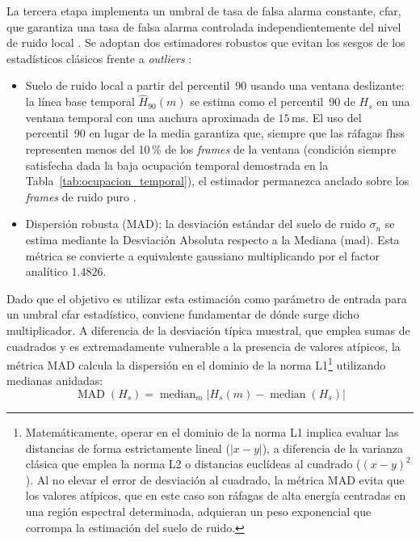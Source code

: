 La tercera etapa implementa un umbral de tasa de falsa alarma constante, \gls{cfar}, que garantiza una tasa de falsa alarma controlada independientemente del nivel de ruido local \cite{zhang_entropy-based_1989}. Se adoptan dos estimadores robustos que evitan los sesgos de los estadísticos clásicos frente a \textit{outliers} \cite{hampel_robust_1986}:

\begin{itemize}\itemsep 0em
    \item Suelo de ruido local a partir del percentil~90 usando una ventana deslizante: la línea base temporal $\widehat{H}_{90}(m)$ se estima como el percentil~90 de $H_s$ en una ventana temporal con una anchura aproximada de $15$\,ms. El uso del percentil~90 en lugar de la media garantiza que, siempre que las ráfagas \gls{fhss} representen menos del 10\,\% de los \textit{frames} de la ventana (condición siempre satisfecha dada la baja ocupación temporal demostrada en la Tabla~\ref{tab:ocupacion_temporal}), el estimador permanezca anclado sobre los \textit{frames} de ruido puro \cite{vasant_ahirrao_rf-based_2024}.

     \item Dispersión robusta (MAD): la desviación estándar del suelo de ruido $\sigma_n$ se estima mediante la Desviación Absoluta respecto a la Mediana (\gls{mad}). Esta métrica se convierte a equivalente gaussiano multiplicando por el factor analítico $1.4826$.
\end{itemize}

Dado que el objetivo es utilizar esta estimación como parámetro de entrada para un umbral \gls{cfar} estadístico, conviene fundamentar de dónde surge dicho multiplicador. A diferencia de la desviación típica muestral, que emplea sumas de cuadrados y es extremadamente vulnerable a la presencia de valores atípicos, la métrica MAD calcula la dispersión en el dominio de la norma L1\footnote{Matemáticamente, operar en el dominio de la norma L1 implica evaluar las distancias de forma estrictamente lineal ($|x - y|$), a diferencia de la varianza clásica que emplea la norma L2 o distancias euclídeas al cuadrado ($(x - y)^2$). Al no elevar el error de desviación al cuadrado, la métrica MAD evita que los valores atípicos, que en este caso son ráfagas de alta energía centradas en una región espectral determinada, adquieran un peso exponencial que corrompa la estimación del suelo de ruido.} utilizando medianas anidadas:
\begin{equation}
    \operatorname{MAD}(H_s) = \operatorname{median}_m\!\left|H_s(m) - \operatorname{median}(H_s)\right|
    \label{eq:mad_def}
\end{equation}

